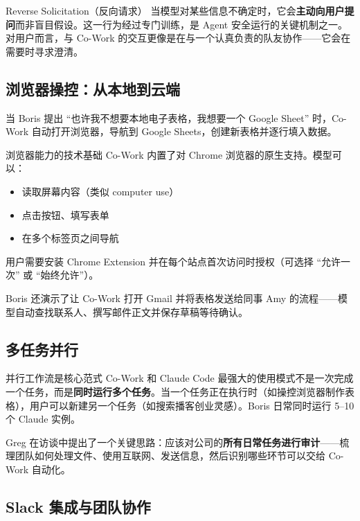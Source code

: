 \documentclass[a4paper]{article}
\begin{document}
\begin{importantbox}{Reverse Solicitation（反向请求）}
当模型对某些信息不确定时，它会\textbf{主动向用户提问}而非盲目假设。这一行为经过专门训练，是 Agent 安全运行的关键机制之一。对用户而言，与 Co-Work 的交互更像是在与一个认真负责的队友协作——它会在需要时寻求澄清。
\end{importantbox}

\subsection{浏览器操控：从本地到云端}

当 Boris 提出 ``也许我不想要本地电子表格，我想要一个 Google Sheet'' 时，Co-Work 自动打开浏览器，导航到 Google Sheets，创建新表格并逐行填入数据。

\begin{knowledgebox}{浏览器能力的技术基础}
Co-Work 内置了对 Chrome 浏览器的原生支持。模型可以：
\begin{itemize}
    \item 读取屏幕内容（类似 computer use）
    \item 点击按钮、填写表单
    \item 在多个标签页之间导航
\end{itemize}
用户需要安装 Chrome Extension 并在每个站点首次访问时授权（可选择 ``允许一次'' 或 ``始终允许''）。
\end{knowledgebox}

Boris 还演示了让 Co-Work 打开 Gmail 并将表格发送给同事 Amy 的流程——模型自动查找联系人、撰写邮件正文并保存草稿等待确认。

\subsection{多任务并行}

\begin{importantbox}{并行工作流是核心范式}
Co-Work 和 Claude Code 最强大的使用模式不是一次完成一个任务，而是\textbf{同时运行多个任务}。当一个任务正在执行时（如操控浏览器制作表格），用户可以新建另一个任务（如搜索播客创业灵感）。Boris 日常同时运行 5--10 个 Claude 实例。
\end{importantbox}

Greg 在访谈中提出了一个关键思路：应该对公司的\textbf{所有日常任务进行审计}——梳理团队如何处理文件、使用互联网、发送信息，然后识别哪些环节可以交给 Co-Work 自动化。

\subsection{Slack 集成与团队协作}
\end{document}
